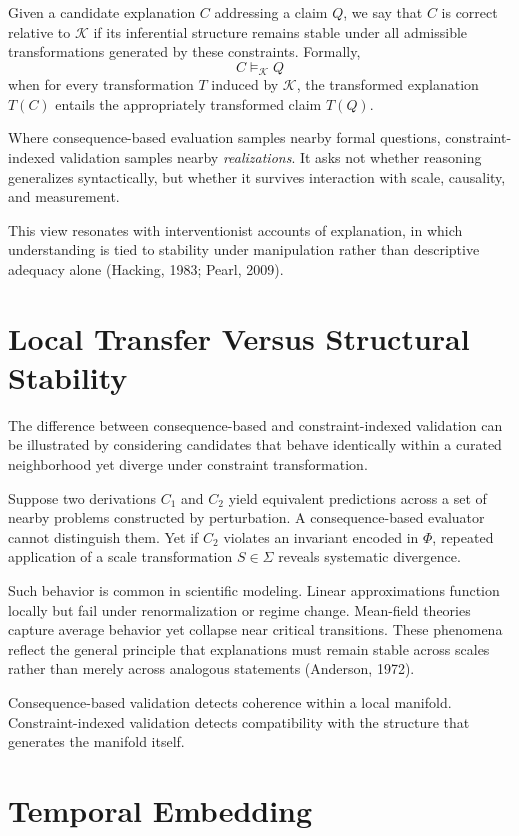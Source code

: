 \documentclass[12pt]{article}
\begin{document}
Given a candidate explanation \(C\) addressing a claim \(Q\), we say that \(C\) is correct relative to \(\mathcal{K}\) if its inferential structure remains stable under all admissible transformations generated by these constraints. Formally,
\[
C \models_{\mathcal{K}} Q
\]
when for every transformation \(T\) induced by \(\mathcal{K}\), the transformed explanation \(T(C)\) entails the appropriately transformed claim \(T(Q)\).

Where consequence-based evaluation samples nearby formal questions, constraint-indexed validation samples nearby \emph{realizations}. It asks not whether reasoning generalizes syntactically, but whether it survives interaction with scale, causality, and measurement.

This view resonates with interventionist accounts of explanation, in which understanding is tied to stability under manipulation rather than descriptive adequacy alone (Hacking, 1983; Pearl, 2009).

\section{Local Transfer Versus Structural Stability}

The difference between consequence-based and constraint-indexed validation can be illustrated by considering candidates that behave identically within a curated neighborhood yet diverge under constraint transformation.

Suppose two derivations \(C_1\) and \(C_2\) yield equivalent predictions across a set of nearby problems constructed by perturbation. A consequence-based evaluator cannot distinguish them. Yet if \(C_2\) violates an invariant encoded in \(\Phi\), repeated application of a scale transformation \(S \in \Sigma\) reveals systematic divergence.

Such behavior is common in scientific modeling. Linear approximations function locally but fail under renormalization or regime change. Mean-field theories capture average behavior yet collapse near critical transitions. These phenomena reflect the general principle that explanations must remain stable across scales rather than merely across analogous statements (Anderson, 1972).

Consequence-based validation detects coherence within a local manifold. Constraint-indexed validation detects compatibility with the structure that generates the manifold itself.

\section{Temporal Embedding}
\end{document}

